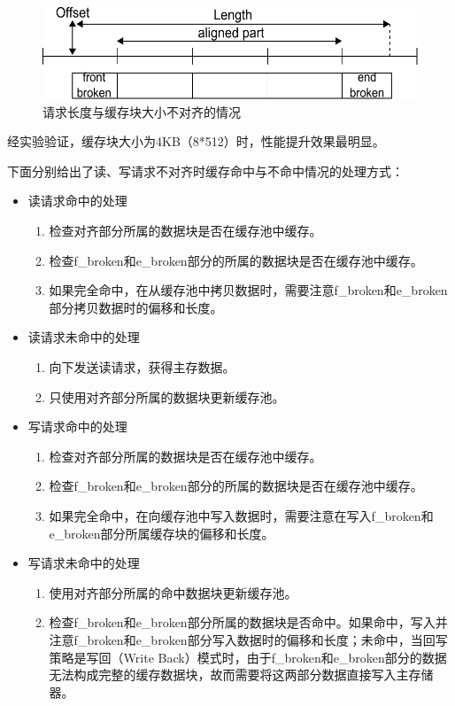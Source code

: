 \begin{figure}[!ht]
\centering
\includegraphics[width=0.8\linewidth]{./graph/vsize-cache-block}
\caption{请求长度与缓存块大小不对齐的情况}
\label{fig:vsize-cache-block}
\end{figure}

经实验验证，缓存块大小为4KB（8*512）时，性能提升效果最明显。

下面分别给出了读、写请求不对齐时缓存命中与不命中情况的处理方式：

\begin{itemize}

\item 读请求命中的处理
\begin{enumerate}
\item 检查对齐部分所属的数据块是否在缓存池中缓存。
\item 检查f\_broken和e\_broken部分的所属的数据块是否在缓存池中缓存。
\item 如果完全命中，在从缓存池中拷贝数据时，需要注意f\_broken和e\_broken部分拷贝数据时的偏移和长度。
\end{enumerate}

\item 读请求未命中的处理
\begin{enumerate}
\item 向下发送读请求，获得主存数据。
\item 只使用对齐部分所属的数据块更新缓存池。
\end{enumerate}

\item 写请求命中的处理
\begin{enumerate}
\item 检查对齐部分所属的数据块是否在缓存池中缓存。
\item 检查f\_broken和e\_broken部分的所属的数据块是否在缓存池中缓存。
\item 如果完全命中，在向缓存池中写入数据时，需要注意在写入f\_broken和e\_broken部分所属缓存块的偏移和长度。
\end{enumerate}

\item 写请求未命中的处理
\begin{enumerate}
\item 使用对齐部分所属的命中数据块更新缓存池。
\item 检查f\_broken和e\_broken部分所属的数据块是否命中。如果命中，写入并注意f\_broken和e\_broken部分写入数据时的偏移和长度；未命中，当回写策略是写回（Write Back）模式时，由于f\_broken和e\_broken部分的数据无法构成完整的缓存数据块，故而需要将这两部分数据直接写入主存储器。
\end{enumerate}

\end{itemize}

